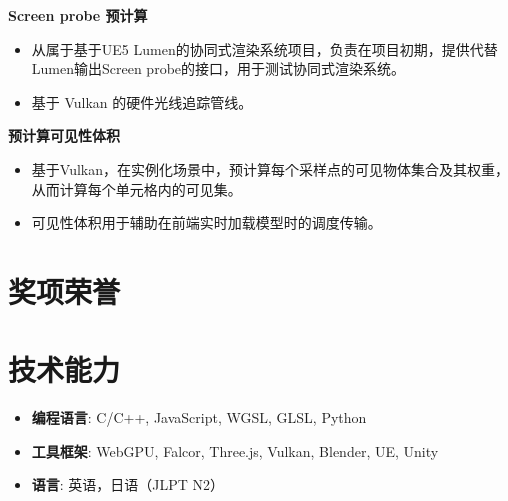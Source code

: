 \documentclass{resume}
\begin{document}
\textbf{Screen probe 预计算}
\begin{itemize}
  \item 从属于基于UE5 Lumen的协同式渲染系统项目，负责在项目初期，提供代替Lumen输出Screen probe的接口，用于测试协同式渲染系统。
  \item 基于 Vulkan 的硬件光线追踪管线。
\end{itemize}

\textbf{预计算可见性体积}
\begin{itemize}
  \item 基于Vulkan，在实例化场景中，预计算每个采样点的可见物体集合及其权重，从而计算每个单元格内的可见集。
  \item 可见性体积用于辅助在前端实时加载模型时的调度传输。
\end{itemize}

\section{奖项荣誉}
\vspace{12pt}
\section{技术能力}
\begin{itemize}[parsep=0.2ex]
  \item \textbf{编程语言}: C/C++, JavaScript, WGSL, GLSL, Python
  \item \textbf{工具框架}: WebGPU, Falcor, Three.js, Vulkan, Blender, UE, Unity
  \item \textbf{语言}: 英语，日语（JLPT N2）
\end{itemize}
\end{document}
